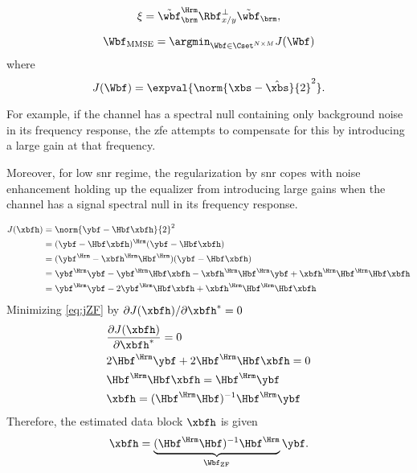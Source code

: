 \begin{equation} \label{eq:MSE_Rxy}
\xi = \tilde{\wbf}_{\brm}^{\Hrm} \Rbf_{x/y}^{\perp}\tilde{\wbf}_{\brm},
\end{equation}


\begin{equation}
\Wbf _ {\mathrm{MMSE}} = \argmin_{ \Wbf \in \Cset^{N \times M}} J(\Wbf)
\end{equation}
where 
\begin{equation} \label{eq:expvalerrorMMSE}
J(\Wbf) = \expval{\norm{\xbs - \hat{\xbs} }{2}^{2}}.
\end{equation}

For example, if the channel has a spectral null containing only background noise in its frequency response, the \gls{zfe} attempts to compensate for this by introducing a large gain at that frequency. 

Moreover, for low \gls{snr} regime, the regularization by \gls{snr} copes with noise enhancement holding up the equalizer from introducing large gains when the channel has a signal spectral null in its frequency response.


\begin{align} 
J(\xbfh) &= \norm{\ybf - \Hbf \xbfh }{2}^{2}  \nonumber \\ 
&= (\ybf - \Hbf \xbfh)^{\Hrm}(\ybf - \Hbf \xbfh) \nonumber \\
&= (\ybf^{\Hrm} - \xbfh ^{\Hrm} \Hbf^{\Hrm} )(\ybf - \Hbf \xbfh) \nonumber  \\
&= \ybf^{\Hrm}\ybf - \ybf^{\Hrm} \Hbf\xbfh - \xbfh ^{\Hrm} \Hbf^{\Hrm}\ybf + \xbfh ^{\Hrm} \Hbf^{\Hrm}\Hbf \xbfh \nonumber \\
&= \ybf^{\Hrm}\ybf  - 2 \ybf^{\Hrm} \Hbf\xbfh + \xbfh ^{\Hrm} \Hbf^{\Hrm}\Hbf \xbfh \label{eq:jZF}
\end{align} 
Minimizing \eqref{eq:jZF} by $\partial J(\xbfh)/\partial\xbfh^{*} = 0$
\begin{align}
&\frac{\partial J(\xbfh)}{\partial \xbfh^{*}} =   0 \nonumber \\
& 2\Hbf^{\Hrm}\ybf + 2\Hbf^{\Hrm}\Hbf \xbfh = 0 \nonumber \\
&\Hbf^{\Hrm}\Hbf \xbfh  = \Hbf^{\Hrm}\ybf \nonumber \\
&\xbfh  = (\Hbf ^{\Hrm} \Hbf )^{-1} \Hbf ^{\Hrm}\ybf
\end{align}
Therefore, the estimated data block $\xbfh$ is given
\begin{equation}
\xbfh =  \underbrace{(\Hbf ^{\Hrm} \Hbf )^{-1} \Hbf ^{\Hrm}}_{\Wbf_ {\textrm{ZF}}} \ybf.
\end{equation}

